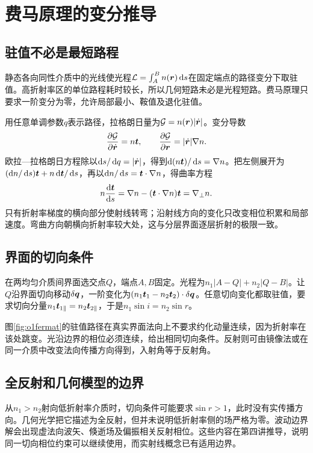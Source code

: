 \section{费马原理的变分推导}
\subsection{驻值不必是最短路程}
静态各向同性介质中的光线使光程$\mathcal L=\int_A^B n(\bm{r})\mathop{}\!\mathrm d s$在固定端点的路径变分下取驻值。高折射率区的单位路程耗时较长，所以几何短路未必是光程短路。费马原理只要求一阶变分为零，允许局部最小、鞍值及退化驻值。

用任意单调参数$q$表示路径，拉格朗日量为$\mathcal G=n(\bm{r})|\dot{\bm{r}}|$。变分导数
\[
 \frac{\partial\mathcal G}{\partial\dot{\bm{r}}}=n\bm{t},
 \qquad \frac{\partial\mathcal G}{\partial\bm{r}}=|\dot{\bm{r}}|\nabla n.
\]
欧拉—拉格朗日方程除以$\mathop{}\!\mathrm d s/\mathop{}\!\mathrm d q=|\dot{\bm{r}}|$，得到$\mathop{}\!\mathrm d(n\bm{t})/\mathop{}\!\mathrm d s=\nabla n$。把左侧展开为$(\mathop{}\!\mathrm d n/\mathop{}\!\mathrm d s)\bm{t}+n\mathop{}\!\mathrm d\bm{t}/\mathop{}\!\mathrm d s$，再以$\mathop{}\!\mathrm d n/\mathop{}\!\mathrm d s=\bm{t}\cdot\nabla n$，得曲率方程
\[
 n\frac{\mathop{}\!\mathrm d\bm{t}}{\mathop{}\!\mathrm d s}
 =\nabla n-(\bm{t}\cdot\nabla n)\bm{t}=\nabla_\perp n.
\]
只有折射率梯度的横向部分使射线转弯；沿射线方向的变化只改变相位积累和局部速度。弯曲方向朝横向折射率较大处，这与分层界面逐层折射的极限一致。

\subsection{界面的切向条件}
在两均匀介质间界面选交点$Q$，端点$A,B$固定。光程为$n_1|A-Q|+n_2|Q-B|$。让$Q$沿界面切向移动$\delta\bm{q}$，一阶变化为$(n_1\bm{t}_1-n_2\bm{t}_2)\cdot\delta\bm{q}$。任意切向变化都取驻值，要求切向分量$n_1\bm{t}_{1\parallel}=n_2\bm{t}_{2\parallel}$，于是$n_1\sin i=n_2\sin r$。

图\ref{fig:o1fermat}的驻值路径在真实界面法向上不要求约化动量连续，因为折射率在该处跳变。光沿边界的相位必须连续，给出相同切向条件。反射则可由镜像法或在同一介质中改变法向传播方向得到，入射角等于反射角。

\subsection{全反射和几何模型的边界}
从$n_1>n_2$射向低折射率介质时，切向条件可能要求$\sin r>1$，此时没有实传播方向。几何光学把它描述为全反射，但并未说明低折射率侧的场严格为零。波动边界解会出现虚法向波矢、倏逝场及偏振相关反射相位。这些内容在第四讲推导，说明同一切向相位约束可以继续使用，而实射线概念已有适用边界。

